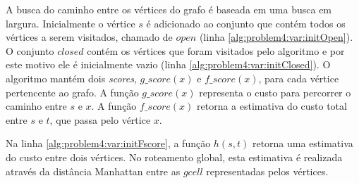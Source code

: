 
A busca do caminho entre os vértices do grafo é baseada em uma busca em largura.
Inicialmente o vértice $s$ é adicionado ao conjunto que contém todos os vértices a serem visitados, chamado de $open$ (linha \ref{alg:problem4:var:initOpen}).
O conjunto $closed$ contém os vértices que foram visitados pelo algoritmo e por este motivo ele é inicialmente vazio (linha \ref{alg:problem4:var:initClosed}).
O algoritmo mantém dois \textit{scores}, $g\_score(x)$ e $f\_score(x)$, para cada vértice pertencente ao grafo. 
A função $g\_score(x)$ representa o custo para percorrer o caminho entre $s$ e $x$.
A função $f\_score(x)$ retorna a estimativa do custo total entre $s$ e $t$, que passa pelo vértice $x$.


Na linha \ref{alg:problem4:var:initFscore}, a função $h(s, t)$ retorna uma estimativa do custo entre dois vértices.
No roteamento global, esta estimativa é realizada através da distância Manhattan entre as $gcell$ representadas pelos vértices.


